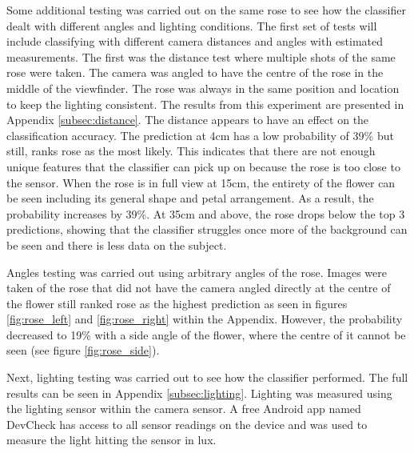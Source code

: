 \documentclass[12pt,a4paper]{report}
\begin{document}
Some additional testing was carried out on the same rose to see how the classifier dealt with different angles and 
lighting conditions. The first set of tests will include classifying with different camera distances and angles with 
estimated measurements. The first was the distance test where multiple shots of the same rose were taken. The camera
was angled to have the centre of the rose in the middle of the viewfinder. The rose was always in the same position and 
location to keep the lighting consistent. The results from this experiment are presented in Appendix 
\ref{subsec:distance}. The distance appears to have an effect on the classification accuracy. The prediction at 4cm has a 
low probability of 39\% but still,
ranks rose as the most likely. This indicates that there are not enough unique features that the classifier can pick up 
on because the rose is too close to the sensor. When the rose is in full view at 15cm, the entirety of the flower can be
seen including its general shape and petal arrangement. As a result, the probability increases by 39\%. At 35cm 
and above, the rose drops below the top 3 predictions, showing that the classifier struggles once more of the 
background can be seen and there is less data on the subject.

\par

Angles testing was carried out using arbitrary angles of the rose. Images were taken of the rose that did not have the camera
angled directly at the centre of the flower still ranked rose as the highest prediction as seen in figures \ref{fig:rose_left} and 
\ref{fig:rose_right} within the Appendix. However, the probability decreased to 19\% with a side angle of the flower, where the centre of
it cannot be seen (see figure \ref{fig:rose_side}).

\par

Next, lighting testing was carried out to see how the classifier performed. The full results can be seen in Appendix 
\ref{subsec:lighting}. Lighting was measured using the lighting 
sensor within the camera sensor. A free Android app named DevCheck \citep{GooglePlayDevCheck} has access to all sensor 
readings on the device and was used to measure the light hitting the sensor in lux.
\end{document}
